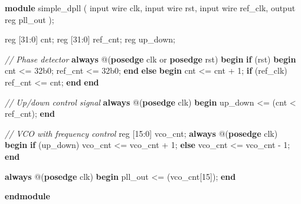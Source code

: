 \documentclass[
]{article}
\newenvironment{Shaded}{}{}
\newcommand{\BaseNTok}[1]{\textcolor[rgb]{0.25,0.63,0.44}{#1}}
\newcommand{\CommentTok}[1]{\textcolor[rgb]{0.38,0.63,0.69}{\textit{#1}}}
\newcommand{\DataTypeTok}[1]{\textcolor[rgb]{0.56,0.13,0.00}{#1}}
\newcommand{\DecValTok}[1]{\textcolor[rgb]{0.25,0.63,0.44}{#1}}
\newcommand{\KeywordTok}[1]{\textcolor[rgb]{0.00,0.44,0.13}{\textbf{#1}}}
\newcommand{\NormalTok}[1]{#1}
\newcommand{\OperatorTok}[1]{\textcolor[rgb]{0.40,0.40,0.40}{#1}}
\begin{document}
\begin{Shaded}
\begin{Highlighting}[]
\KeywordTok{module}\NormalTok{ simple\_dpll }\OperatorTok{(}
  \DataTypeTok{input} \DataTypeTok{wire}\NormalTok{ clk}\OperatorTok{,}
  \DataTypeTok{input} \DataTypeTok{wire}\NormalTok{ rst}\OperatorTok{,}
  \DataTypeTok{input} \DataTypeTok{wire}\NormalTok{ ref\_clk}\OperatorTok{,}
  \DataTypeTok{output} \DataTypeTok{reg}\NormalTok{ pll\_out}
\OperatorTok{);}

  \DataTypeTok{reg} \OperatorTok{[}\DecValTok{31}\OperatorTok{:}\DecValTok{0}\OperatorTok{]}\NormalTok{ cnt}\OperatorTok{;}
  \DataTypeTok{reg} \OperatorTok{[}\DecValTok{31}\OperatorTok{:}\DecValTok{0}\OperatorTok{]}\NormalTok{ ref\_cnt}\OperatorTok{;}
  \DataTypeTok{reg}\NormalTok{ up\_down}\OperatorTok{;}

  \CommentTok{// Phase detector}
  \KeywordTok{always} \OperatorTok{@(}\KeywordTok{posedge}\NormalTok{ clk }\DataTypeTok{or} \KeywordTok{posedge}\NormalTok{ rst}\OperatorTok{)} \KeywordTok{begin}
    \KeywordTok{if} \OperatorTok{(}\NormalTok{rst}\OperatorTok{)} \KeywordTok{begin}
\NormalTok{      cnt }\OperatorTok{\textless{}=} \BaseNTok{32\textquotesingle{}b0}\OperatorTok{;}
\NormalTok{      ref\_cnt }\OperatorTok{\textless{}=} \BaseNTok{32\textquotesingle{}b0}\OperatorTok{;}
    \KeywordTok{end} \KeywordTok{else} \KeywordTok{begin}
\NormalTok{      cnt }\OperatorTok{\textless{}=}\NormalTok{ cnt }\OperatorTok{+} \DecValTok{1}\OperatorTok{;}
      \KeywordTok{if} \OperatorTok{(}\NormalTok{ref\_clk}\OperatorTok{)}\NormalTok{ ref\_cnt }\OperatorTok{\textless{}=}\NormalTok{ cnt}\OperatorTok{;}
    \KeywordTok{end}
  \KeywordTok{end}

  \CommentTok{// Up/down control signal}
  \KeywordTok{always} \OperatorTok{@(}\KeywordTok{posedge}\NormalTok{ clk}\OperatorTok{)} \KeywordTok{begin}
\NormalTok{    up\_down }\OperatorTok{\textless{}=} \OperatorTok{(}\NormalTok{cnt }\OperatorTok{\textless{}}\NormalTok{ ref\_cnt}\OperatorTok{);}
  \KeywordTok{end}

  \CommentTok{// VCO with frequency control}
  \DataTypeTok{reg} \OperatorTok{[}\DecValTok{15}\OperatorTok{:}\DecValTok{0}\OperatorTok{]}\NormalTok{ vco\_cnt}\OperatorTok{;}
  \KeywordTok{always} \OperatorTok{@(}\KeywordTok{posedge}\NormalTok{ clk}\OperatorTok{)} \KeywordTok{begin}
    \KeywordTok{if} \OperatorTok{(}\NormalTok{up\_down}\OperatorTok{)}\NormalTok{ vco\_cnt }\OperatorTok{\textless{}=}\NormalTok{ vco\_cnt }\OperatorTok{+} \DecValTok{1}\OperatorTok{;}
    \KeywordTok{else}\NormalTok{ vco\_cnt }\OperatorTok{\textless{}=}\NormalTok{ vco\_cnt }\OperatorTok{{-}} \DecValTok{1}\OperatorTok{;}
  \KeywordTok{end}

  \KeywordTok{always} \OperatorTok{@(}\KeywordTok{posedge}\NormalTok{ clk}\OperatorTok{)} \KeywordTok{begin}
\NormalTok{    pll\_out }\OperatorTok{\textless{}=} \OperatorTok{(}\NormalTok{vco\_cnt}\OperatorTok{[}\DecValTok{15}\OperatorTok{]);}
  \KeywordTok{end}

\KeywordTok{endmodule}
\end{Highlighting}
\end{Shaded}
\end{document}
